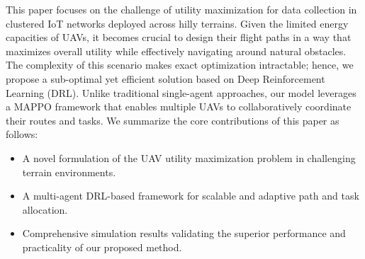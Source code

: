 \documentclass[conference]{IEEEtran}
\begin{document}
This paper focuses on the challenge of utility maximization for data collection in clustered IoT networks deployed across hilly terrains. Given the limited energy capacities of UAVs, it becomes crucial to design their flight paths in a way that maximizes overall utility while effectively navigating around natural obstacles. The complexity of this scenario makes exact optimization intractable; hence, we propose a sub-optimal yet efficient solution based on Deep Reinforcement Learning (DRL). Unlike traditional single-agent approaches, our model leverages a MAPPO framework that enables multiple UAVs to collaboratively coordinate their routes and tasks. We summarize the core contributions of this paper as follows:
\begin{itemize}
    \item A novel formulation of the UAV utility maximization problem in challenging terrain environments.
    \item A multi-agent DRL-based framework for scalable and adaptive path and task allocation.
    \item Comprehensive simulation results validating the superior performance and practicality of our proposed method.
\end{itemize}


\end{document}
